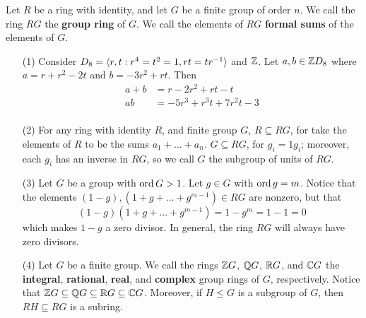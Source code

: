 \begin{definition}
    Let $R$ be a ring with identity, and let  $G$ be a finite group of order
    $n$. We call the ring $RG$ the \textbf{group ring} of $G$. We call the
    elements of  $RG$  \textbf{formal sums} of the elements of $G$.
\end{definition}

\begin{example}\label{example_5.8}
    \begin{enumerate}
        \item[(1)] Consider $D_8=\langle r,t : r^4=t^2=1, rt=tr^{-1} \rangle$
            and $\mathbb{Z}$. Let $a,b \in \mathbb{Z}{D_8}$ where $a=r+r^2-2t$ and  $b=-3r^2+rt$.
            Then
            \begin{align*}
                a+b &=  r-2r^2+rt-t \\
                ab  &=  -5r^3+r^3t+7r^2t-3  \\
            \end{align*}

        \item[(2)] For any ring with identity $R$, and finite group $G$, $R
            \subseteq RG$, for take the elements of  $R$ to be the sums
            $a_1+\dots+a_n$. $G \subseteq RG$, for  $g_i=1g_i$; moreover, each
            $g_i$ has an inverse in  $RG$, so we call  $G$ the subgroup of units
            of $RG$.

        \item[(3)] Let $G$ be a group with $\operatorname{ord}{G}>1$. Let $g \in G$ with
            $\operatorname{ord}{g}=m$. Notice that the elements $(1-g),(1+g+\dots+g^{m-1}) \in
            RG$ are nonzero, but that
            \begin{equation*}
                (1-g)(1+g+\dots+g^{m-1})=1-g^m=1-1=0
            \end{equation*}
            which makes $1-g$ a zero divisor. In general, the ring $RG$ will
            always have zero divisors.

        \item[(4)] Let $G$ be a finite group. We call the rings  $\mathbb{Z}{G}$,
            $\mathbb{Q}{G}$, $\mathbb{R}{G}$, and $\mathbb{C}{G}$ the \textbf{integral},
            \textbf{rational}, \textbf{real}, and \textbf{complex} group rings
            of $G$, respectively. Notice that $\mathbb{Z}{G} \subseteq \mathbb{Q}{G} \subseteq
            \mathbb{R}{G} \subseteq \mathbb{C}{G}$. Moreover, if $H \leq G$ is a subgroup of
            $G$, then  $RH \subseteq RG$ is a subring.
    \end{enumerate}
\end{example}
